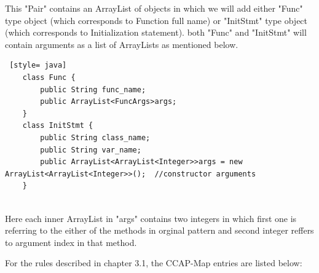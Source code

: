  This "Pair" contains an ArrayList of objects in which we will add either "Func" type object (which corresponds to Function full name) or "InitStmt" type object (which corresponds to Initialization statement). both "Func" and "InitStmt" will contain arguments as a list of ArrayLists as mentioned below.

\begin{lstlisting} [style= java]
    class Func {
        public String func_name;
        public ArrayList<FuncArgs>args;
    }
    class InitStmt {
        public String class_name;
        public String var_name;
        public ArrayList<ArrayList<Integer>>args = new ArrayList<ArrayList<Integer>>();  //constructor arguments
    }
     
 \end{lstlisting}
 
Here each inner ArrayList in "args" contains two integers in which first one is referring to the either of the methods in orginal pattern and second integer reffers to argument index in that method.

For the rules described in chapter 3.1, the CCAP-Map entries are listed below:

